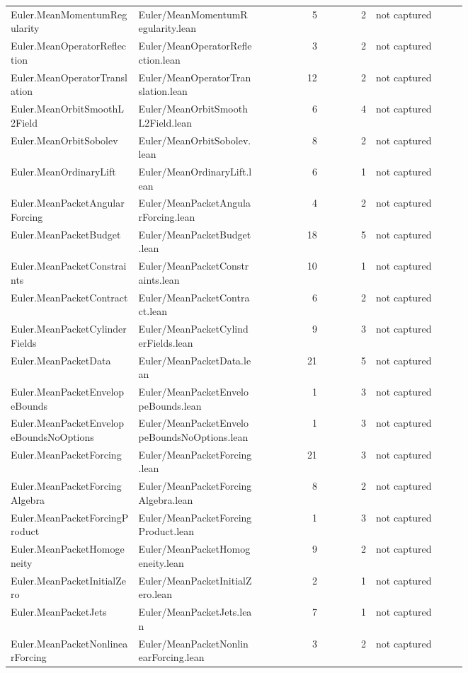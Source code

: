 \documentclass[10pt]{article}
\begin{document}
\begin{longtable}{p{0.28\linewidth}p{0.27\linewidth}r r p{0.20\linewidth}}
Euler.MeanMomentumRegularity & Euler/MeanMomentumRegularity.lean & 5 & 2 & not captured\\
Euler.MeanOperatorReflection & Euler/MeanOperatorReflection.lean & 3 & 2 & not captured\\
Euler.MeanOperatorTranslation & Euler/MeanOperatorTranslation.lean & 12 & 2 & not captured\\
Euler.MeanOrbitSmoothL2Field & Euler/MeanOrbitSmoothL2Field.lean & 6 & 4 & not captured\\
Euler.MeanOrbitSobolev & Euler/MeanOrbitSobolev.lean & 8 & 2 & not captured\\
Euler.MeanOrdinaryLift & Euler/MeanOrdinaryLift.lean & 6 & 1 & not captured\\
Euler.MeanPacketAngularForcing & Euler/MeanPacketAngularForcing.lean & 4 & 2 & not captured\\
Euler.MeanPacketBudget & Euler/MeanPacketBudget.lean & 18 & 5 & not captured\\
Euler.MeanPacketConstraints & Euler/MeanPacketConstraints.lean & 10 & 1 & not captured\\
Euler.MeanPacketContract & Euler/MeanPacketContract.lean & 6 & 2 & not captured\\
Euler.MeanPacketCylinderFields & Euler/MeanPacketCylinderFields.lean & 9 & 3 & not captured\\
Euler.MeanPacketData & Euler/MeanPacketData.lean & 21 & 5 & not captured\\
Euler.MeanPacketEnvelopeBounds & Euler/MeanPacketEnvelopeBounds.lean & 1 & 3 & not captured\\
Euler.MeanPacketEnvelopeBoundsNoOptions & Euler/MeanPacketEnvelopeBoundsNoOptions.lean & 1 & 3 & not captured\\
Euler.MeanPacketForcing & Euler/MeanPacketForcing.lean & 21 & 3 & not captured\\
Euler.MeanPacketForcingAlgebra & Euler/MeanPacketForcingAlgebra.lean & 8 & 2 & not captured\\
Euler.MeanPacketForcingProduct & Euler/MeanPacketForcingProduct.lean & 1 & 3 & not captured\\
Euler.MeanPacketHomogeneity & Euler/MeanPacketHomogeneity.lean & 9 & 2 & not captured\\
Euler.MeanPacketInitialZero & Euler/MeanPacketInitialZero.lean & 2 & 1 & not captured\\
Euler.MeanPacketJets & Euler/MeanPacketJets.lean & 7 & 1 & not captured\\
Euler.MeanPacketNonlinearForcing & Euler/MeanPacketNonlinearForcing.lean & 3 & 2 & not captured\\

\end{longtable}
\end{document}
